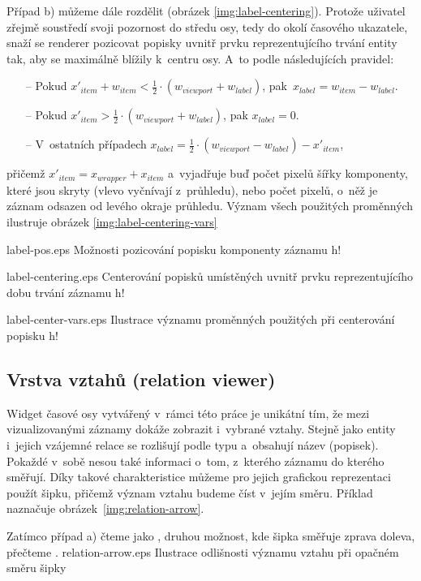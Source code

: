 				Případ b) můžeme dále rozdělit (obrázek \ref{img:label-centering}). Protože uživatel zřejmě sou\-středí svoji pozornost do středu osy, tedy do okolí časového ukazatele, snaží se renderer pozicovat popisky uvnitř prvku reprezentujícího trvání entity tak, aby se maximálně blížily k~centru osy. A~to podle následujících pravidel:
				\begin{itemize}
					\item[--] Pokud $x'_{item} + w_{item} < \frac{1}{2} \cdot (w_{viewport} + w_{label})$, \mbox{pak $x_{label} = w_{item} - w_{label}$}.
					\item[--] Pokud $x'_{item} > \frac{1}{2} \cdot (w_{viewport} + w_{label})$, pak $x_{label} = 0$.
					\item[--] V~ostatních případech $x_{label} = \frac{1}{2}\cdot (w_{viewport} - w_{label}) - x'_{item}$,
				\end{itemize}
				přičemž $x'_{item} = x_{wrapper} + x_{item}$ a~vyjadřuje buď počet pixelů šířky komponenty, které jsou skryty (vlevo vyčnívají z~průhledu), nebo počet pixelů, o~něž je záznam odsazen od levého okraje průhledu. Význam všech použitých proměnných ilustruje obrázek \ref{img:label-centering-vars}
				
				{}{label-pos.eps}
				{Možnosti pozicování popisku komponenty záznamu}
				{h!}
			
				{}{label-centering.eps}
				{Centerování popisků umístěných uvnitř prvku reprezentujícího dobu trvání záznamu}
				{h!}
				
				{}{label-center-vars.eps}
				{Ilustrace významu proměnných použitých při centerování popisku}
				{h!}
			
		\subsection{Vrstva vztahů (relation viewer)}
			\label{relation-viewer}
			Widget časové osy vytvářený v~rámci této práce je unikátní tím, že mezi vizua\-lizovanými záznamy dokáže zobrazit i~vybrané vztahy. Stejně jako entity i~jejich vzájemné relace se rozlišují podle typu a~obsahují název (popisek). Pokaždé v~sobě nesou také informaci o~tom, z~kterého záznamu do kterého směřují. Díky takové charakteristice můžeme pro jejich grafickou reprezentaci použít šipku, přičemž význam vztahu budeme číst v~jejím směru. Příklad naznačuje obrázek~\ref{img:relation-arrow}.
			
			Zatímco případ a) čteme jako \emph{}, druhou možnost, kde šipka směřuje zprava doleva, přečteme \emph{}.
			{}{relation-arrow.eps}
			{Ilustrace odlišnosti významu vztahu při opačném směru šipky}{}
			
